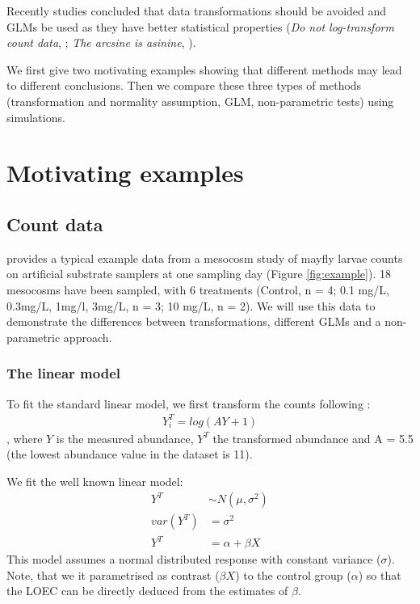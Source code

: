 \documentclass{scrartcl}
\begin{document}
Recently studies concluded that data transformations should be avoided and GLMs be used as they have better statistical properties (\emph{Do not log-transform count data}, \citep{ohara_not_2010}; \emph{The arcsine is asinine}, \citep{warton_arcsine_2011}).

We first give two motivating examples showing that different methods may lead to different conclusions. 
Then we compare these three types of methods (transformation and normality assumption, GLM, non-parametric tests) using simulations.


\section{Motivating examples}
\subsection{Count data}
\citet{brock_minimum_2014} provides a typical example data from a mesocosm study of mayfly larvae counts on artificial substrate samplers at one sampling day (Figure \ref{fig:example}). 
18 mesocosms have been sampled, with 6 treatments (Control, n = 4; 0.1 mg/L, 0.3mg/L, 1mg/l, 3mg/L, n = 3; 10 mg/L, n = 2).
We will use this data to demonstrate the differences between transformations, different GLMs and a non-parametric approach.

\subsubsection{The linear model}
To fit the standard linear model, we first transform the counts following \citet{van_den_brink_impact_2000}:
$$\begin{aligned}
  Y^T_i = log(AY + 1) \label{eqn:trans}
\end{aligned}$$
, where $Y$ is the measured abundance, $Y^T$ the transformed abundance and A = 5.5 (the lowest abundance value in the dataset is 11).

We fit the well known linear model:
$$\begin{aligned}
  Y^T &\sim N(\mu, \sigma^2) \nonumber \\
  var(Y^T) &= \sigma^2 \label{eqn:normal} \\
  Y^T &= \alpha + \beta X \nonumber
\end{aligned}$$
This model assumes a normal distributed response with constant variance ($\sigma$).
Note, that we it parametrised as contrast ($\beta X$) to the control group ($\alpha$) so that the LOEC can be directly deduced from the estimates of $\beta$.
\end{document}
